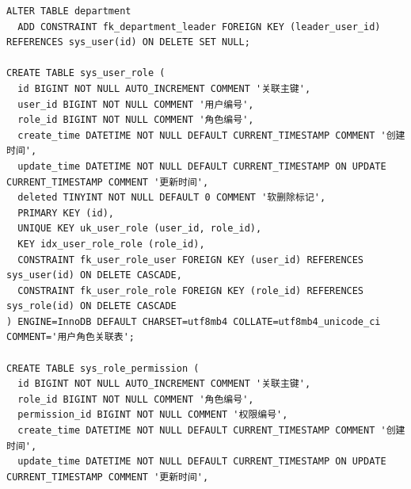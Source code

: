 \begin{lstlisting}[style=sqlstyle]
ALTER TABLE department
  ADD CONSTRAINT fk_department_leader FOREIGN KEY (leader_user_id) REFERENCES sys_user(id) ON DELETE SET NULL;

CREATE TABLE sys_user_role (
  id BIGINT NOT NULL AUTO_INCREMENT COMMENT '关联主键',
  user_id BIGINT NOT NULL COMMENT '用户编号',
  role_id BIGINT NOT NULL COMMENT '角色编号',
  create_time DATETIME NOT NULL DEFAULT CURRENT_TIMESTAMP COMMENT '创建时间',
  update_time DATETIME NOT NULL DEFAULT CURRENT_TIMESTAMP ON UPDATE CURRENT_TIMESTAMP COMMENT '更新时间',
  deleted TINYINT NOT NULL DEFAULT 0 COMMENT '软删除标记',
  PRIMARY KEY (id),
  UNIQUE KEY uk_user_role (user_id, role_id),
  KEY idx_user_role_role (role_id),
  CONSTRAINT fk_user_role_user FOREIGN KEY (user_id) REFERENCES sys_user(id) ON DELETE CASCADE,
  CONSTRAINT fk_user_role_role FOREIGN KEY (role_id) REFERENCES sys_role(id) ON DELETE CASCADE
) ENGINE=InnoDB DEFAULT CHARSET=utf8mb4 COLLATE=utf8mb4_unicode_ci COMMENT='用户角色关联表';

CREATE TABLE sys_role_permission (
  id BIGINT NOT NULL AUTO_INCREMENT COMMENT '关联主键',
  role_id BIGINT NOT NULL COMMENT '角色编号',
  permission_id BIGINT NOT NULL COMMENT '权限编号',
  create_time DATETIME NOT NULL DEFAULT CURRENT_TIMESTAMP COMMENT '创建时间',
  update_time DATETIME NOT NULL DEFAULT CURRENT_TIMESTAMP ON UPDATE CURRENT_TIMESTAMP COMMENT '更新时间',
\end{lstlisting}
